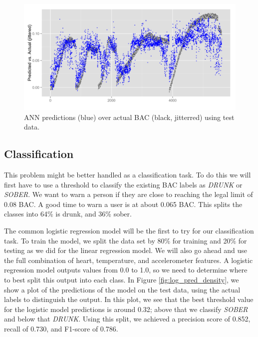 \begin{figure}
	\includegraphics[width=1.0\textwidth]{../figs/nn_all}
	\caption{ANN predictions (blue) over actual BAC (black, jitterred) using test data.}
	\label{fig:nn_all}
\end{figure}

\subsection{Classification}

This problem might be better handled as a classification task. To do this we will first have to use a threshold to classify the existing BAC labels as \textit{DRUNK} or \textit{SOBER}. We want to warn a person if they are close to reaching the legal limit of 0.08 BAC. A good time to warn a user is at about 0.065 BAC. This splits the classes into 64\% is drunk, and 36\% sober.

The common logistic regression model will be the first to try for our classification task. To train the model, we split the data set by 80\% for training and 20\% for testing as we did for the linear regression model. We will also go ahead and use the full combination of heart, temperature, and accelerometer features. A logistic regression model outputs values from 0.0 to 1.0, so we need to determine where to best split this output into each class. In Figure \ref{fig:log_pred_density}, we show a plot of the predictions of the model on the test data, using the actual labels to distinguish the output. In this plot, we see that the best threshold value for the logistic model predictions is around 0.32; above that we classify \textit{SOBER} and below that \textit{DRUNK}. Using this split, we achieved a precision score of 0.852, recall of 0.730, and F1-score of 0.786.

